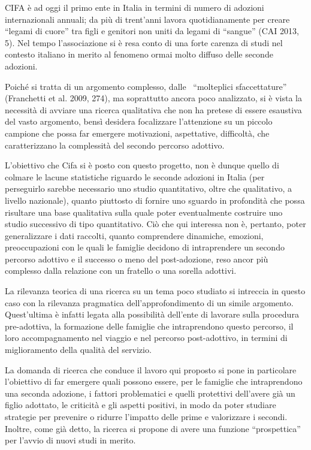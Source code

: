\documentclass[12pt,oneside,svgnames]{memoir}
\begin{document}
CIFA è ad oggi il primo ente in Italia in termini di numero di adozioni
internazionali annuali; da più di trent'anni lavora quotidianamente per
creare ``legami di cuore'' tra figli e genitori non uniti da legami di
``sangue'' (CAI 2013, 5). Nel tempo l'associazione si è resa conto di
una forte carenza di studi nel contesto italiano in merito al fenomeno
ormai molto diffuso delle seconde adozioni.

Poiché si tratta di un argomento complesso, dalle ~``molteplici
sfaccettature'' (Franchetti et al. 2009, 274), ma soprattutto ancora
poco analizzato, si è vista la necessità di avviare una ricerca
qualitativa che non ha pretese di essere esaustiva del vasto argomento,
bensì desidera focalizzare l'attenzione su un piccolo campione che possa
far emergere motivazioni, aspettative, difficoltà, che caratterizzano la
complessità del secondo percorso adottivo.

L'obiettivo che Cifa si è posto con questo progetto, non è dunque quello
di colmare le lacune statistiche riguardo le seconde adozioni in Italia
(per perseguirlo sarebbe necessario uno studio quantitativo, oltre che
qualitativo, a livello nazionale), quanto piuttosto di fornire uno
sguardo in profondità che possa risultare una base qualitativa sulla
quale poter eventualmente costruire uno studio successivo di tipo
quantitativo. Ciò che qui interessa non è, pertanto, poter generalizzare
i dati raccolti, quanto comprendere dinamiche, emozioni, preoccupazioni
con le quali le famiglie decidono di intraprendere un secondo percorso
adottivo e il successo o meno del post-adozione, reso ancor più
complesso dalla relazione con un fratello o una sorella adottivi.

La rilevanza teorica di una ricerca su un tema poco studiato si
intreccia in questo caso con la rilevanza pragmatica
dell'approfondimento di un simile argomento. Quest'ultima è infatti
legata alla possibilità dell'ente di lavorare sulla procedura
pre-adottiva, la formazione delle famiglie che intraprendono questo
percorso, il loro accompagnamento nel viaggio e nel percorso
post-adottivo, in termini di miglioramento della qualità del servizio.

La domanda di ricerca che conduce il lavoro qui proposto si pone in
particolare l'obiettivo di far emergere quali possono essere, per le
famiglie che intraprendono una seconda adozione, i fattori problematici
e quelli protettivi dell'avere già un figlio adottato, le criticità e
gli aspetti positivi, in modo da poter studiare strategie per prevenire
o ridurre l'impatto delle prime e valorizzare i secondi. Inoltre, come
già detto, la ricerca si propone di avere una funzione ``prospettica''
per l'avvio di nuovi studi in merito.
\end{document}

